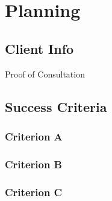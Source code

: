 \documentclass[12pt]{article} %
\begin{document}

\tableofcontents %

\newpage %


\section{Planning} %



\subsection{Client Info} %
Proof of Consultation



\subsection{Success Criteria} %




\subsubsection{Criterion A } %

\subsubsection{Criterion B}

\subsubsection{Criterion C}

\newpage
\end{document}

